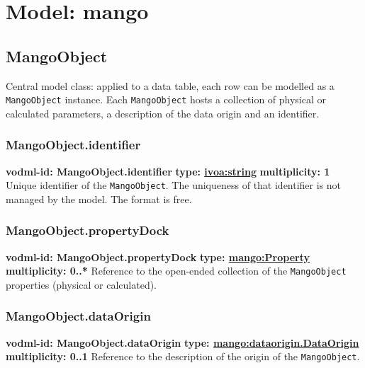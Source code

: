 \pagebreak

\section{Model: mango}

  \subsection{MangoObject}
    \label{sect:MangoObject}
    Central model class: applied to a data table, each row can be modelled as a \texttt{MangoObject} instance. Each \texttt{MangoObject} hosts a collection of physical or calculated parameters, a description of the data origin and an identifier.

    \subsubsection{MangoObject.identifier}
    \textbf{vodml-id: MangoObject.identifier} \newline
    \textbf{type: \hyperref[sect:ivoa]{ivoa:string}} \newline
    \textbf{multiplicity: 1} \newline
    Unique identifier of the \texttt{MangoObject}. The uniqueness of that identifier is not managed by the model. The format is free.

    \subsubsection{MangoObject.propertyDock}
    \textbf{vodml-id: MangoObject.propertyDock} \newline
    \textbf{type: \hyperref[sect:Property]{mango:Property}} \newline
    \textbf{multiplicity: 0..*} \newline
    Reference to the open-ended collection of the \texttt{MangoObject} properties (physical or calculated).

    \subsubsection{MangoObject.dataOrigin}
    \textbf{vodml-id: MangoObject.dataOrigin} \newline
    \textbf{type: \hyperref[sect:dataorigin.DataOrigin]{mango:dataorigin.DataOrigin}} \newline
    \textbf{multiplicity: 0..1} \newline
    Reference to the description of the origin of the \texttt{MangoObject}.

